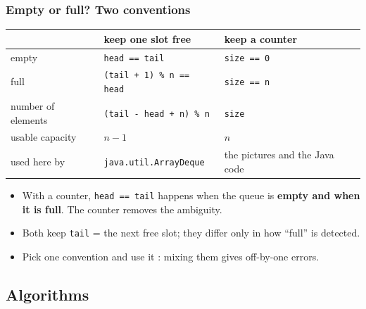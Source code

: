 \documentclass[aspectratio=169,10pt,compress]{beamer}
\begin{document}
\begin{frame}[t,fragile] \frametitle{Empty or full? Two conventions}
  \begin{center}\small
  \begin{tabular}{lll}
    \toprule
                              & \textbf{keep one slot free}          & \textbf{keep a counter} \\
    \midrule
    empty                     & \texttt{head == tail}                & \texttt{size == 0} \\
    full                      & \texttt{(tail + 1) \% n == head}     & \texttt{size == n} \\
    number of elements        & \texttt{(tail - head + n) \% n}      & \texttt{size} \\
    usable capacity           & $n - 1$                              & $n$ \\
    \midrule
    used here by              & \texttt{java.util.ArrayDeque}        & the pictures and the Java code \\
    \bottomrule
  \end{tabular}
  \end{center}
  \vspace{0.4em}
  \begin{itemize}\small
    \item With a counter, \texttt{head == tail} happens when the queue is \textbf{empty and when it is full}.
          The counter removes the ambiguity.
    \item Both keep \texttt{tail} = the next free slot; they differ only in how ``full'' is detected.
    \item Pick one convention and use it : mixing them gives off-by-one errors.
  \end{itemize}
\end{frame}

\subsection[Algorithms]{Algorithms}
\end{document}

